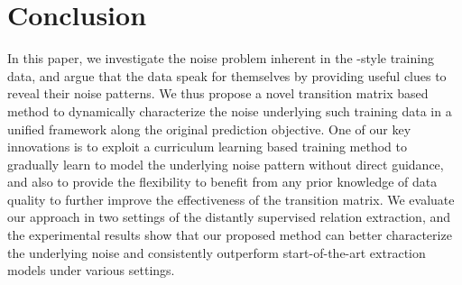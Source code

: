 \section{Conclusion}
In this paper, we investigate the noise problem inherent in  the \DS-style training data, and argue that the data speak for themselves by providing useful clues to reveal their noise patterns.
We thus propose a novel transition matrix based method to dynamically characterize the noise underlying such training data in a unified framework along  the original prediction objective.  
%
One of our key innovations is to exploit a curriculum learning based training method to gradually  learn to model  the underlying noise pattern without direct guidance, and also to provide the flexibility to benefit from any prior knowledge of data quality to further improve the effectiveness of the transition matrix. 
We evaluate our approach in two settings of the distantly supervised relation extraction, and the experimental results show 
that  our proposed method can better characterize the underlying noise and consistently outperform start-of-the-art extraction models under various settings. 

